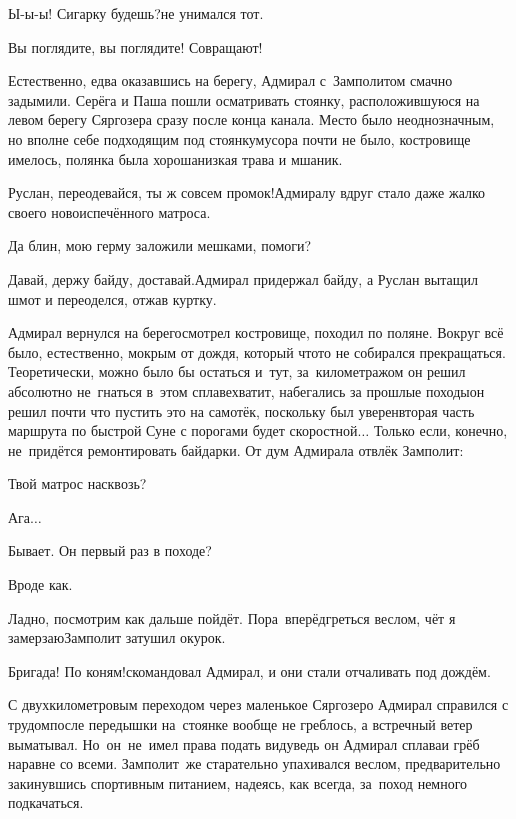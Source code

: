 \diagdash Ы-ы-ы! Сигарку будешь?\mdash не унимался тот.

\diagdash Вы поглядите, вы поглядите! Совращают!

Естественно, едва оказавшись на берегу, Адмирал с~Замполитом смачно задымили. Серёга и Паша пошли осматривать стоянку, расположившуюся на левом берегу Сяргозера сразу после конца канала. Место было неоднозначным, но вполне себе подходящим под стоянку\mdash мусора почти не было, костровище имелось, полянка была хороша\mdash низкая трава и мшаник.

\diagdash Руслан, переодевайся, ты ж совсем промок!\mdash Адмиралу вдруг стало даже жалко своего новоиспечённого матроса. 

\diagdash Да блин, мою герму заложили мешками, помоги?

\diagdash Давай, держу байду, доставай.\mdash Адмирал придержал байду, а Руслан вытащил шмот и переоделся, отжав куртку. 

Адмирал вернулся на берег\mdash осмотрел костровище, походил по поляне. Вокруг всё было, естественно, мокрым от дождя, который что\sdash то не собирался прекращаться. Теоретически, можно было бы остаться и~тут, за~километражом он решил абсолютно не~гнаться в~этом сплаве\mdash хватит, набегались за прошлые походы\mdash он решил почти что пустить это на самотёк, поскольку был уверен\mdash вторая часть маршрута по быстрой Суне с порогами будет скоростной$\ldots$ Только если, конечно, не~придётся ремонтировать байдарки. От дум Адмирала отвлёк Замполит:

\diagdash Твой матрос насквозь?

\diagdash Ага$\ldots$

\diagdash Бывает. Он первый раз в походе?

\diagdash Вроде как.

\diagdash Ладно, посмотрим как дальше пойдёт. Пора~вперёд\mdash греться веслом, чёт я замерзаю\mdash Замполит затушил окурок.

\diagdash Бригада! По коням!\mdash скомандовал Адмирал, и они стали отчаливать под дождём.

С двухкилометровым переходом через маленькое Сяргозеро Адмирал справился с трудом\mdash после передышки на~стоянке вообще не греблось, а встречный ветер выматывал. Но~он~не~имел права подать виду\mdash ведь он Адмирал сплава\mdash и грёб наравне со всеми. Замполит~же старательно упахивался веслом, предварительно закинувшись спортивным питанием, надеясь, как всегда, за~поход немного подкачаться. 

